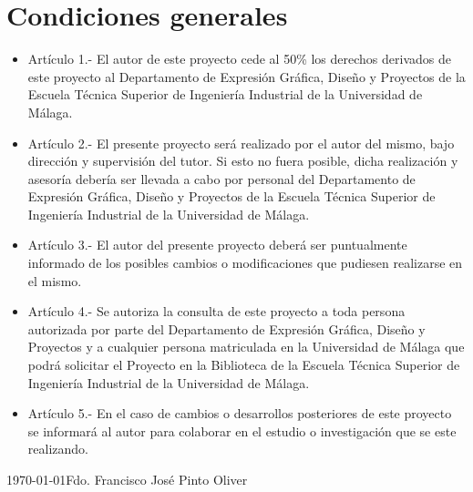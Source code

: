 \chapter*{Condiciones generales}

\begin{itemize}
\item Artículo 1.- El autor de este proyecto cede al 50\% los derechos derivados de este proyecto al Departamento de Expresión Gráfica, Diseño y Proyectos de la Escuela Técnica Superior de Ingeniería Industrial de la Universidad de Málaga.

\item Artículo 2.- El presente proyecto será realizado por el autor del mismo, bajo dirección y supervisión del tutor. Si esto no fuera posible, dicha realización y asesoría debería ser llevada a cabo por personal del Departamento de Expresión Gráfica, Diseño y Proyectos de la Escuela Técnica Superior de Ingeniería Industrial de la Universidad de Málaga.

\item Artículo 3.- El autor del presente proyecto deberá ser puntualmente informado de los posibles cambios o modificaciones que pudiesen realizarse en el mismo.

\item Artículo 4.- Se autoriza la consulta de este proyecto a toda persona autorizada por parte del Departamento de Expresión Gráfica, Diseño y Proyectos y a cualquier persona matriculada en la Universidad de Málaga que podrá solicitar el Proyecto en la Biblioteca de la Escuela Técnica Superior de Ingeniería Industrial de la Universidad de Málaga.

\item Artículo 5.- En el caso de cambios o desarrollos posteriores de este proyecto se informará al autor para colaborar en el estudio o investigación que se este realizando.
\end{itemize}

\today \hfill Fdo. Francisco José Pinto Oliver


